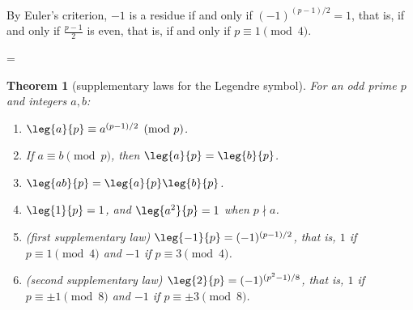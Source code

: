 \documentclass[11pt]{article}
\makeatletter
\theoremstyle{ntstyle}
\newtheorem{theorem}{Theorem}[subsection]
\let\nt@closedisplay\]
\def\nt@guardedclose{\@ifnextchar\par{\nt@closeafterpar}{\@ifnextchar\end{\postdisplaypenalty\@M\nt@closedisplay}{\nt@closedisplay}}}
\def\nt@closeafterpar\par{\@ifnextchar\par{\nt@closeafterpar}{\@ifnextchar\end{\postdisplaypenalty\@M\nt@closedisplay\par}{\nt@closedisplay\par}}}
\renewenvironment{proof}[1][\proofname]{\par
  \pushQED{\qed}\normalfont\topsep\medskipamount\edef\nt@afterproof{\@endparpenalty=\the\@endparpenalty\relax}\@beginparpenalty\@M\@endparpenalty\@M\let\]\nt@guardedclose\trivlist\item[]\textit{#1\@addpunct{.}} \ignorespaces}{\ifvmode\addpenalty\@M\fi\popQED\nt@afterproof\endtrivlist\@endpefalse}
\makeatother
\begin{document}
\begin{proof} By Euler's criterion, $-1$ is a residue if
	and only if $(-1)^{(p-1)/2} = 1$, that is, if and only if
	$\tfrac{p-1}{2}$ is even, that is, if and only if $p \equiv 1 \pmod{4}$.

\end{proof}
\begin{theorem}[supplementary laws for the Legendre symbol]\label{thm:7.2.5} For an odd prime $p$
	and integers $a, b$:

	\begin{enumerate}[label={\alph*)}]
		\item $\leg{a}{p} \equiv a^{(p-1)/2} \pmod{p}$.

		\item If $a \equiv b \pmod{p}$, then $\leg{a}{p} =
			      \leg{b}{p}$.

		\item $\leg{ab}{p} =
			      \leg{a}{p}\leg{b}{p}$.

		\item $\leg{1}{p} = 1$, and $\leg{a^{2}}{p}
			      = 1$ when $p \nmid a$.

		\item (first supplementary law) $\leg{-1}{p} = (-1)^{(p-1)/2}$, that is,
		      $1$ if $p \equiv 1 \pmod{4}$ and $-1$ if $p \equiv 3 \pmod{4}$.

		\item (second supplementary law) $\leg{2}{p} = (-1)^{(p^{2}-1)/8}$, that
		      is, $1$ if $p \equiv \pm 1 \pmod{8}$ and $-1$ if $p \equiv \pm 3
			      \pmod{8}$.
	\end{enumerate}

\end{theorem}
\end{document}

